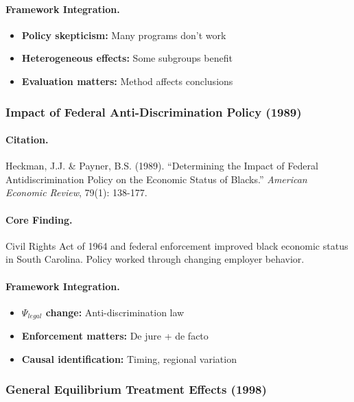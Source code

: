 \paragraph{Framework Integration.}
\begin{itemize}
  \item \textbf{Policy skepticism:} Many programs don't work
  \item \textbf{Heterogeneous effects:} Some subgroups benefit
  \item \textbf{Evaluation matters:} Method affects conclusions
\end{itemize}

\subsubsection{Impact of Federal Anti-Discrimination Policy (1989)}

\paragraph{Citation.}
Heckman, J.J. \& Payner, B.S. (1989). ``Determining the Impact of Federal
Antidiscrimination Policy on the Economic Status of Blacks.''
\emph{American Economic Review}, 79(1): 138-177.

\paragraph{Core Finding.}
Civil Rights Act of 1964 and federal enforcement improved black
economic status in South Carolina. Policy worked through changing
employer behavior.

\paragraph{Framework Integration.}
\begin{itemize}
  \item \textbf{$\Psi_{legal}$ change:} Anti-discrimination law
  \item \textbf{Enforcement matters:} De jure + de facto
  \item \textbf{Causal identification:} Timing, regional variation
\end{itemize}

\subsubsection{General Equilibrium Treatment Effects (1998)}

